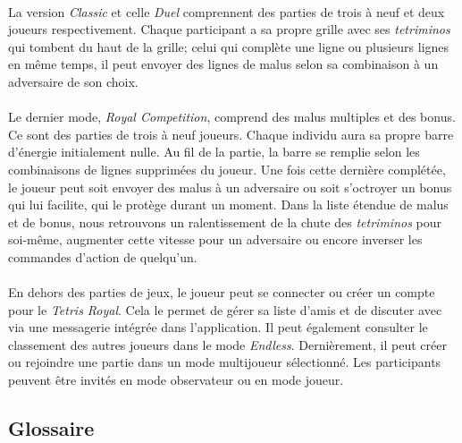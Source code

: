 \documentclass{article}
\begin{document}
\paragraph*{}

La version \textit{Classic} et celle \textit{Duel} comprennent des parties de trois à neuf et deux joueurs respectivement. Chaque participant a sa propre grille avec ses \textit{tetriminos} qui tombent du haut de la grille; celui qui complète une ligne ou plusieurs lignes en même temps, il peut envoyer des lignes de malus selon sa combinaison à un adversaire de son choix. 

\paragraph*{}

Le dernier mode, \textit{ Royal Competition}, comprend des malus multiples et des bonus. Ce sont des parties de trois à neuf joueurs. Chaque individu aura sa propre barre d'énergie initialement nulle. Au fil de la partie, la barre se remplie selon les combinaisons de lignes supprimées du joueur. Une fois cette dernière complétée, le joueur peut soit envoyer des malus à un adversaire ou soit s'octroyer un bonus qui lui facilite, qui le protège durant un moment. Dans la liste étendue de malus et de bonus, nous retrouvons un ralentissement de la chute des \textit{tetriminos} pour soi-même, augmenter cette vitesse pour un adversaire ou encore inverser les commandes d'action de quelqu'un.

\paragraph*{}

En dehors des parties de jeux, le joueur peut se connecter ou créer un compte pour le \textit{Tetris Royal}. Cela le permet de gérer sa liste d'amis et de discuter avec via une messagerie intégrée dans l'application. Il peut également consulter le classement des autres joueurs dans le mode \textit{Endless}. Dernièrement, il peut créer ou rejoindre une partie dans un mode multijoueur sélectionné. Les participants peuvent être invités en mode observateur ou en mode joueur.


\subsection{Glossaire}
\end{document}
